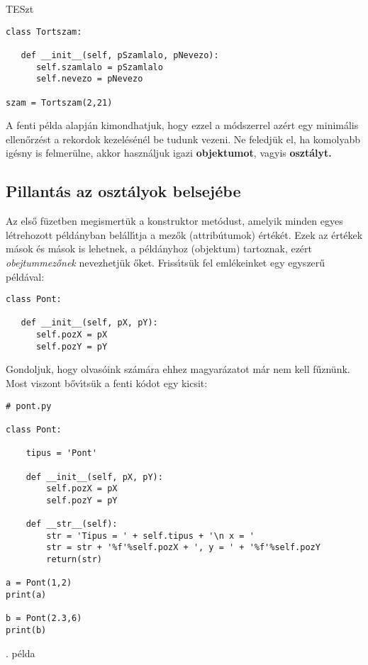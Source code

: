 TESzt

\begin{Verbatim}[fontsize=\small]
class Tortszam:

   def __init__(self, pSzamlalo, pNevezo):
      self.szamlalo = pSzamlalo
      self.nevezo = pNevezo

szam = Tortszam(2,21)

\end{Verbatim}

\noindent A fenti p\'elda alapj\'an kimondhatjuk, hogy ezzel a m\'odszerrel az\'ert egy 
minim\'alis ellen\H{o}rz\'est a rekordok kezel\'es\'en\'el be tudunk vezeni. Ne feledj\"uk el, 
ha komolyabb ig\'esny is felmer\"ulne, akkor haszn\'aljuk igazi {\bf objektumot}, vagyis 
{\bf oszt\'alyt.}

\subsection{Pillant\'as az oszt\'alyok belsej\'ebe}

Az els\H{o} f\"uzetben megismert\"uk a konstruktor met\'odust, amelyik minden egyes l\'etrehozott 
p\'eld\'anyban bel\'all\'{\i}tja a mez\H{o}k (attrib\'utumok) \'ert\'ek\'et. Ezek az \'ert\'ekek 
m\'asok \'es m\'asok is lehetnek, a p\'eld\'anyhoz (objektum) tartoznak, ez\'ert {\sl obejtummez\H{o}nek} 
 nevezhetj\"uk \H{o}ket. Friss\'{\i}ts\"uk fel eml\'ekeinket egy egyszer\H{u} 
p\'eld\'aval:

\begin{Verbatim}[fontsize=\small]
class Pont:

   def __init__(self, pX, pY):
      self.pozX = pX
      self.pozY = pY
\end{Verbatim}

\noindent Gondoljuk, hogy olvas\'oink sz\'am\'ara ehhez magyar\'azatot m\'ar nem kell f\H{u}zn\"unk. 
Most viszont b\H{o}v\'{\i}ts\"uk a fenti k\'odot egy kicsit:

\incminta
\begin{Verbatim}[fontsize=\small]
# pont.py

class Pont:

    tipus = 'Pont'

    def __init__(self, pX, pY):
        self.pozX = pX
        self.pozY = pY

    def __str__(self):
        str = 'Tipus = ' + self.tipus + '\n x = ' 
        str = str + '%f'%self.pozX + ', y = ' + '%f'%self.pozY
        return(str)

a = Pont(1,2)
print(a)

b = Pont(2.3,6)
print(b)
\end{Verbatim}
\theminta. p\'elda

